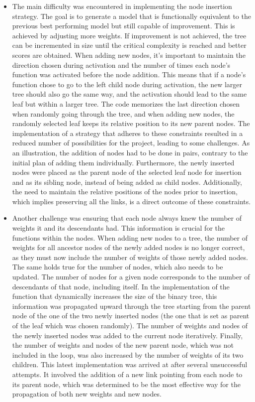 \begin{itemize}
  \item The main difficulty was encountered in implementing the node insertion strategy. The goal is to generate a model that is functionally equivalent to the previous best performing model but still capable of improvement. This is achieved by adjusting more weights. If improvement is not achieved, the tree can be incremented in size until the critical complexity is reached and better scores are obtained. When adding new nodes, it's important to maintain the direction chosen during activation and the number of times each node's function was activated before the node addition. This means that if a node's function chose to go to the left child node during activation, the new larger tree should also go the same way, and the activation should lead to the same leaf but within a larger tree. The code memorizes the last direction chosen when randomly going through the tree, and when adding new nodes, the randomly selected leaf keeps its relative position to its new parent nodes. The implementation of a strategy that adheres to these constraints resulted in a reduced number of possibilities for the project, leading to some challenges. As an illustration, the addition of nodes had to be done in pairs, contrary to the initial plan of adding them individually. Furthermore, the newly inserted nodes were placed as the parent node of the selected leaf node for insertion and as its sibling node, instead of being added as child nodes. Additionally, the need to maintain the relative positions of the nodes prior to insertion, which implies preserving all the links, is a direct outcome of these constraints.

  \item Another challenge was ensuring that each node always knew the number of weights it and its descendants had. This information is crucial for the functions within the nodes. When adding new nodes to a tree, the number of weights for all ancestor nodes of the newly added nodes is no longer correct, as they must now include the number of weights of those newly added nodes. The same holds true for the number of nodes, which also needs to be updated. The number of nodes for a given node corresponds to the number of descendants of that node, including itself. In the implementation of the function that dynamically increases the size of the binary tree, this information was propagated upward through the tree starting from the parent node of the one of the two newly inserted nodes (the one that is set as parent of the leaf which was chosen randomly). The number of weights and nodes of the newly inserted nodes was added to the current node iteratively. Finally, the number of weights and nodes of the new parent node, which was not included in the loop, was also increased by the number of weights of its two children. This latest implementation was arrived at after several unsuccessful attempts. It involved the addition of a new link pointing from each node to its parent node, which was determined to be the most effective way for the propagation of both new weights and new nodes.
\end{itemize}